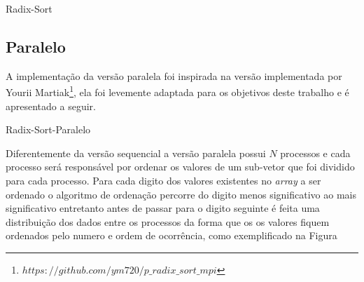 \documentclass[journal]{IEEEtran}
\begin{document}
\begin{algorithm}
\caption{Radix-Sort}
\DontPrintSemicolon
{}

 
\end{algorithm}


\subsection{Paralelo}

A implementação da versão paralela foi inspirada na versão implementada por Yourii Martiak\footnote{$https://github.com/ym720/p\_radix\_sort\_mpi$}, ela foi levemente adaptada para os objetivos deste trabalho e é apresentado a seguir.

\begin{algorithm}
\caption{Radix-Sort-Paralelo}
\DontPrintSemicolon
{}
\end{algorithm}


Diferentemente da versão sequencial a versão paralela possui $N$ processos e cada processo será responsável por ordenar os valores de um sub-vetor que foi dividido para cada processo. Para cada digito dos valores existentes no \textit{array} a ser ordenado o algoritmo de ordenação percorre do digito menos significativo ao mais significativo entretanto antes de passar para o digito seguinte é feita uma distribuição dos dados entre os processos da forma que os os valores fiquem ordenados pelo numero e ordem de ocorrência, como exemplificado na Figura 
\end{document}
